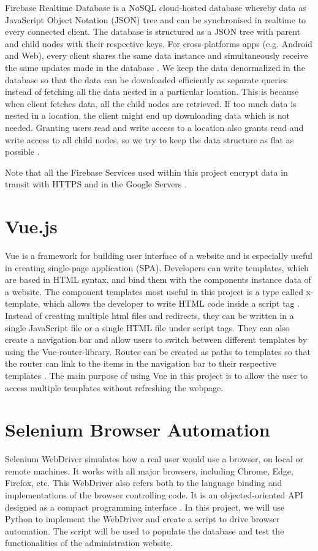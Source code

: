 \documentclass[../report.tex]{subfiles}
\begin{document}
Firebase Realtime Database is a NoSQL cloud-hosted database whereby data as JavaScript Object Notation (JSON) tree and can be synchronised in realtime to every connected client. The database is structured as a JSON tree with parent and child nodes with their respective keys. For cross-platforms apps (e.g. Android and Web), every client shares the same data instance and simultaneously receive the same updates made in the database \cite{firebase-realtime-database}. We keep the data denormalized in the database so that the data can be downloaded efficiently as separate queries instead of fetching all the data nested in a particular location. This is because when client fetches data, all the child nodes are retrieved. If too much data is nested in a location, the client might end up downloading data which is not needed. Granting users read and write access to a location also grants read and write access to all child nodes, so we try to keep the data structure as flat as possible \cite{firebase-database-structure}.

Note that all the Firebase Services used within this project encrypt data in transit with HTTPS and in the Google Servers \cite{firebase-database-security}.

\section{Vue.js}
Vue is a framework for building user interface of a website and is especially useful in creating single-page application (SPA). Developers can write templates, which are based in HTML syntax, and bind them with the components instance data of a website. The component templates most useful in this project is a type called x-template, which allows the developer to write HTML code inside a script tag \cite{vue-js}. Instead of creating multiple html files and redirects, they can be written in a single JavaScript file or a single HTML file under script tags. They can also create a navigation bar and allow users to switch between different templates by using the Vue-router-library. Routes can be created as paths to templates so that the router can link to the items in the navigation bar to their respective templates \cite{vue-js-routing}. The main purpose of using Vue in this project is to allow the user to access multiple templates without refreshing the webpage.

\section{Selenium Browser Automation}
Selenium WebDriver simulates how a real user would use a browser, on local or remote machines. It works with all major browsers, including Chrome, Edge, Firefox, etc. This WebDriver also refers both to the language binding and implementations of the browser controlling code. It is an objected-oriented API designed as a compact programming interface \cite{selenium-docs}. In this project, we will use Python to implement the WebDriver and create a script to drive browser automation. The script will be used to populate the database and test the functionalities of the administration website.
\end{document}
